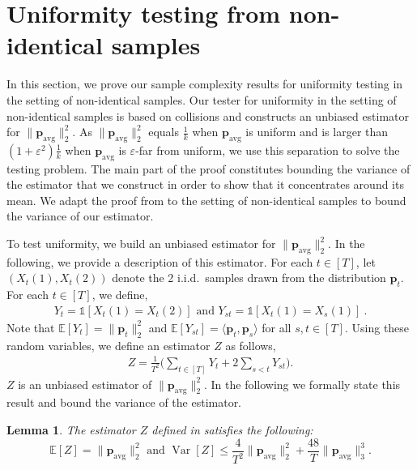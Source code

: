\documentclass[10pt]{article} %
\def\eps{{\varepsilon}}
\newcommand{\E}{\mathbb{E}}
\theoremstyle{plain}
\newtheorem{lemma}[theorem]{Lemma}
\newcommand{\bp}{\textbf{p}}
\newcommand{\avg}{\mathrm{avg}}
\newcommand{\Var}{\operatorname{{Var}}}
\begin{document}
\section{Uniformity testing from non-identical samples}
\label{sec:uni}
\allowdisplaybreaks

In this section, we prove our sample complexity results for uniformity testing in the setting of non-identical samples. Our tester for uniformity in the setting of non-identical samples is based on collisions and constructs an unbiased estimator for $\|\bp_{\avg}\|_2^2$. As $\|\bp_{\avg}\|_2^2$ equals $\frac{1}{k}$ when $\bp_{\avg}$ is uniform and is larger than $(1+\eps^2)\frac{1}{k}$ when $\bp_{\avg}$ is $\eps$-far from uniform, we use this separation to solve the testing problem. The main part of the proof constitutes bounding the variance of the estimator that we construct in order to show that it concentrates around its mean. We adapt the proof from \cite{diakonikolas2016collision} to the setting of non-identical samples to bound the variance of our estimator.

 
To test uniformity, we build an unbiased estimator for $\|\bp_{\avg}\|^2_2$. In the following, we provide a description of this estimator. For each $t \in [T]$, let $(X_t(1), X_t(2))$ denote the 2 i.i.d.\ samples drawn from the distribution $\bp_t$. For each $t\in [T]$, we define,
\begin{align*}
	Y_{t} = \mathds{1}[X_t(1) = X_t(2)] \text{ and }
	Y_{st} = \mathds{1}[X_t(1) = X_s(1)]~.
\end{align*}
Note that $\E[Y_{t}]=\|\bp_t\|^2_2$ and $\E[Y_{st}]=\langle \bp_t, \bp_{s} \rangle$ for all $s,t\in [T]$. Using these random variables, we define an estimator $Z$ as follows,
\begin{align}\label{eq:estimator}
	Z = \frac{1}{T^2}\Big(\sum_{t \in [T]}Y_{t} + 2\sum_{s < t}Y_{st}\Big).
\end{align}
$Z$ is an unbiased estimator of $\|\bp_{\avg}\|^2_2$. In the following we formally state this result and bound the variance of the estimator.

\begin{lemma}\label{lem:uniformityup}
	The estimator $Z$ defined in  satisfies the following:
	$$\E[Z] = \|\bp_{\avg}\|^2_2 \text{ and }\Var[Z] \leq \frac{4}{T^2}\Big\| \bp_{\avg} \Big\|^2_2 + \frac{48}{T}\Big\| \bp_{\avg}\Big\|^3_3.$$
\end{lemma}
\end{document}
